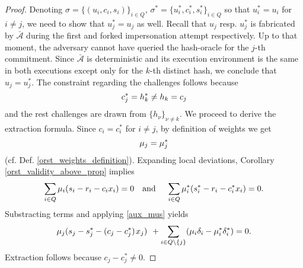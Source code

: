 \documentclass[psamsfonts, reqno]{amsart}
\theoremstyle{definition}
\theoremstyle{remark}
\numberwithin{equation}{section}
\begin{document}
\begin{proof}
Denoting $\sigma = \{(u_i, c_i, s_i)\}_{i \in Q}$,
$\sigma^* = \{u_i^*, c_i^*, s_i^*\}_{i \in Q}$ so that
$u_i^* = u_i$ for $i \neq j$,
we need to show that $u_j^* = u_j$ as well.
Recall that
$u_j$ resp. $u_j^*$ is fabricated by
$\mathcal{\bar{A}}$ during the first and forked impersonation attempt respectively.
Up to that moment, the adversary cannot have queried the
hash-oracle for the $j$-th commitment.
Since $\mathcal{\bar{A}}$ is deterministic and its execution environment is the same in both executions except only for the
$k$-th distinct hash, we conclude that $u_j = u_j^*$.
The constraint regarding the challenges follows because
\vspace{5pt}
\begin{equation*}
c_j^* = h_k^* \neq h_k = c_j
\vspace{5pt}
\end{equation*}
and the rest challenges are drawn from $\{h_\nu\}_{\nu \neq k}$.
We proceed to derive the extraction formula.
Since $c_i = c^*_i$ for $i \neq j$,
by definition of weights we get
\begin{equation}\label{aux_mus}
\mu_j = \mu^*_j
\vspace{3pt}
\end{equation}
(cf. Def. \ref{orst_weights_definition}).
Expanding local deviations, Corollary
\ref{orst_validity_above_prop} implies
\vspace{5pt}
\begin{equation*}
\sum_{i \in Q} \mu_i (s_i - r_i - c_i x_i) = 0
\ \ \ \text{and}\ \ \ \
\sum_{i \in Q} \mu_i^* (s_i^* - r_i - c_i^* x_i) = 0.
\vspace{5pt}
\end{equation*}
Substracting terms and applying \eqref{aux_mus} yields
\vspace{5pt}
\begin{equation*}
\mu_j (s_j - s_j^* - (c_j - c_j^*)\hspace{1pt} x_j)
\hspace{4pt}
+
\sum_{i \in Q \setminus \{j\}}(
\mu_i \delta_i
-
\mu_i^* \delta_i^*
) = 0.
\vspace{5pt}
\end{equation*}
Extraction follows because $c_j - c_j^* \neq 0$.
\vspace{0pt}
\end{proof}
\end{document}

